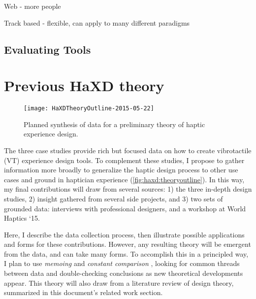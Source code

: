 Web - more people

Track based - flexible, can apply to many different paradigms




\subsection{Evaluating \haxd Tools}

\section{Previous HaXD theory}


\begin{figure}[h] %
   \centering
   \texttt{[image: HaXDTheoryOutline-2015-05-22]} 
   \caption{Planned synthesis of data for a preliminary theory of haptic experience design.}
   \label{fig:haxd:theoryoutline}
\end{figure}


The three case studies provide rich but focused data on how to create vibrotactile (VT) experience design tools.
To complement these studies, I propose to gather information more broadly to generalize the haptic design process to other use cases and ground in haptician experience (\autoref{fig:haxd:theoryoutline}).
In this way, my final contributions will draw from several sources: 
1) the three in-depth design studies,
2) insight gathered from several side projects, and
3) two sets of grounded data: interviews with professional designers, and
a workshop at World Haptics `15.

Here, I describe the data collection process, then illustrate possible applications and forms for these contributions.
However, any resulting theory will be emergent from the data, and can take many forms.
To accomplish this in a principled way, I plan to use \emph{memoing} and \emph{constant comparison} \cite{Corbin2008}, looking for common threads between data and double-checking conclusions as new theoretical developments appear.
This theory will also draw from a literature review of design theory, summarized in this document's related work section.





